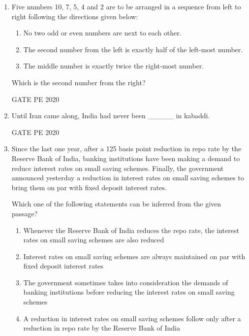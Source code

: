 \documentclass[journal,12pt,onecolumn]{IEEEtran}
\theoremstyle{remark}
\begin{document}
\begin{enumerate}
    \item Five numbers 10, 7, 5, 4 and 2 are to be arranged in a sequence from left to right following the directions given below:
    
    \begin{enumerate}
        \item No two odd or even numbers are next to each other.
        \item The second number from the left is exactly half of the left-most number.
        \item The middle number is exactly twice the right-most number.
    \end{enumerate}
    
    Which is the second number from the right?
    \begin{enumerate}
    \end{enumerate}
      \hfill{GATE PE 2020}
    \item Until Iran came along, India had never been \_\_\_\_\_ in kabaddi.
    \begin{enumerate}
\end{enumerate}
      \hfill{GATE PE 2020}

    \item Since the last one year, after a 125 basis point reduction in repo rate by the Reserve Bank of India, banking institutions have been making a demand to reduce interest rates on small saving schemes. Finally, the government announced yesterday a reduction in interest rates on small saving schemes to bring them on par with fixed deposit interest rates.
    
    Which one of the following statements can be inferred from the given passage?
    \begin{enumerate}
    
        \item  Whenever the Reserve Bank of India reduces the repo rate, the interest rates on small saving schemes are also reduced 
        \item  Interest rates on small saving schemes are always maintained on par with fixed deposit interest rates
        \item The government sometimes takes into consideration the demands of banking institutions before reducing the interest rates on small saving schemes
        \item  A reduction in interest rates on small saving schemes follow only after a reduction in repo rate by the Reserve Bank of India
   

\end{enumerate}
\end{enumerate}
\end{document}
